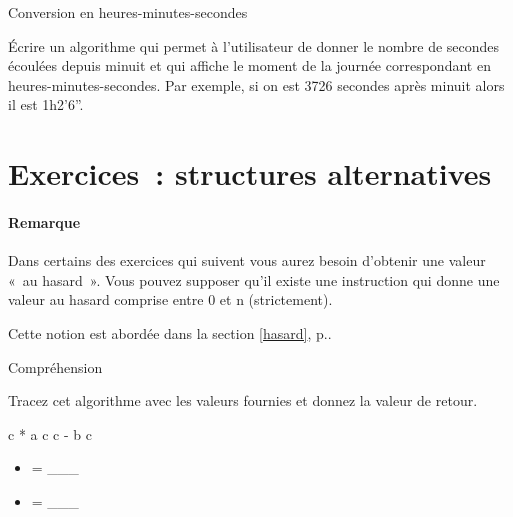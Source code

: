 	\begin{Exercice}{Conversion en heures-minutes-secondes}

		Écrire un algorithme qui permet à l’utilisateur
		de donner le nombre de secondes écoulées depuis minuit
		et qui affiche le moment de la journée correspondant
		en heures-minutes-secondes.
		Par exemple, si on est 3726 secondes après minuit
		alors il est 1h2'6''.
	\end{Exercice}



\clearpage
\section{Exercices~: structures alternatives}			

\begin{Emphase}
	
	\paragraph{Remarque} Dans certains des exercices qui suivent vous aurez
	besoin d'obtenir une valeur «~au hasard~». Vous pouvez supposer qu'il existe
	une instruction  qui donne une valeur au hasard comprise entre
	0 et n (strictement).

	Cette notion est abordée dans la section \ref{hasard}, p.\pageref{hasard}.

\end{Emphase}

\begin{Exercice}{Compréhension}
		
	Tracez cet algorithme avec les valeurs fournies et donnez la valeur de
	retour.
	
	\begin{pseudocode}
			\Let c  * a
			\Let c \Gets c - b
		\EndIf
		\Return c
	\EndAlgo
\end{pseudocode}		
\begin{multicols}{2}
	\begin{itemize}
		\item {} = \_\_\_
		\item {} = \_\_\_
	\end{itemize}
\end{multicols}	
	\end{Exercice}

